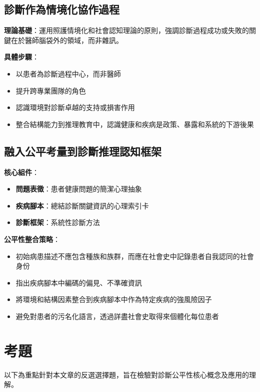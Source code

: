 \documentclass[12pt,a4paper]{article}
\begin{document}
\subsection{診斷作為情境化協作過程}
\textbf{理論基礎}：運用照護情境化和社會認知理論的原則，強調診斷過程成功或失敗的關鍵在於醫師腦袋外的領域，而非雜訊。

\textbf{具體步驟}：
\begin{itemize}[nosep]
    \item 以患者為診斷過程中心，而非醫師
    \item 提升跨專業團隊的角色
    \item 認識環境對診斷卓越的支持或損害作用
    \item 整合結構能力到推理教育中，認識健康和疾病是政策、暴露和系統的下游後果
\end{itemize}

\subsection{融入公平考量到診斷推理認知框架}
\textbf{核心組件}：
\begin{itemize}[nosep]
    \item \textbf{問題表徵}：患者健康問題的簡潔心理抽象
    \item \textbf{疾病腳本}：總結診斷關鍵資訊的心理索引卡
    \item \textbf{診斷框架}：系統性診斷方法
\end{itemize}

\textbf{公平性整合策略}：
\begin{itemize}[nosep]
    \item 初始病患描述不應包含種族和族群，而應在社會史中記錄患者自我認同的社會身份
    \item 指出疾病腳本中編碼的偏見、不準確資訊
    \item 將環境和結構因素整合到疾病腳本中作為特定疾病的強風險因子
    \item 避免對患者的污名化語言，透過詳盡社會史取得來個體化每位患者
\end{itemize}

\section{考題}

以下為重點針對本文章的反選選擇題，旨在檢驗對診斷公平性核心概念及應用的理解。
\end{document}
